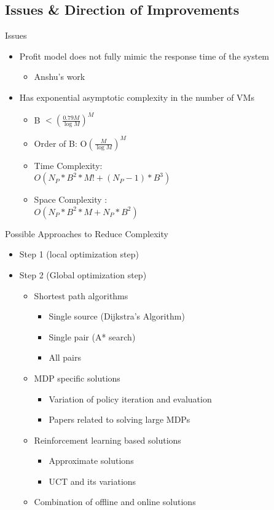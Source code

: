 \documentclass{beamer}
\makeatletter
\newcounter{multipleslide}
\newcommand{\multipleframe}
{
	\setcounter{multipleslide}{\value{framenumber}}
	\stepcounter{multipleslide}
	\patchcmd{\beamer@@tmpl@footline}
	{\insertframenumber}
	{\themultipleslide}
	{}
	{}
}
\newcommand{\restoreframe}
{
	\patchcmd{\beamer@@tmpl@footline}
	{\themultipleslide}
  	{\insertframenumber}
	{}
	{}
	\setcounter{framenumber}{\value{multipleslide}}
}
\makeatother
\begin{document}
\subsection{Issues \& Direction of Improvements}
\multipleframe
\begin{frame}{Issues}
\begin{itemize}
\item Profit model does not fully mimic the response time of the system
\begin{itemize}
\item Anshu's work
\end{itemize}
\item Has exponential asymptotic complexity in the number of VMs
\begin{itemize}
\item B  $< \left(\frac{0.79M}{\log M}\right)^{M}$
\item Order of B: O$\left(\frac{M}{\log M}\right) ^{M}$
\item Time Complexity: \\
\hspace*{1cm} $O\left(N_P*B^{2}*M! + \left(N_P-1\right)*B^{3}\right)$
\item Space Complexity : \\
\hspace*{1cm} $O\left(N_P*B^{2}*M + N_P*B^{2}\right)$
\end{itemize}
\end{itemize}
\end{frame}

\begin{frame}{Possible Approaches to Reduce Complexity}
\begin{itemize}
\item Step 1 (local optimization step)
\item Step 2 (Global optimization step)
\begin{itemize}
\item Shortest path algorithms
\begin{itemize}
\item Single source (Dijkstra's Algorithm)
\item Single pair (A* search)
\item All pairs
\end{itemize}
\item MDP specific solutions
\begin{itemize}
\item Variation of policy iteration and evaluation
\item Papers related to solving large MDPs
\end{itemize}
\item Reinforcement learning based solutions
\begin{itemize}
\item Approximate solutions
\item UCT and its variations
\end{itemize}
\item Combination of offline and online solutions
\end{itemize}
\end{itemize}
\end{frame}
\restoreframe
\end{document}
